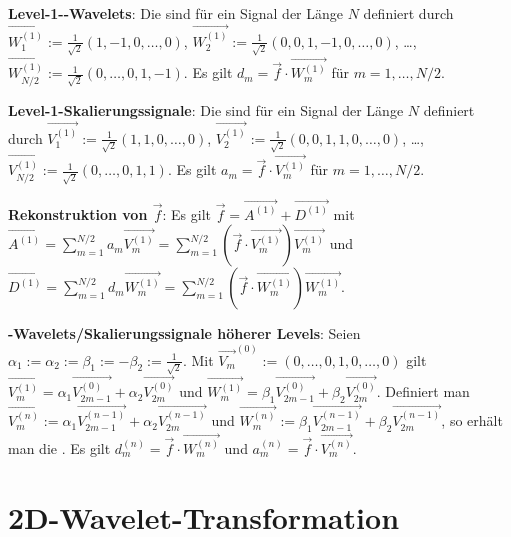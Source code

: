 \linie

\textbf{Level-1--Wavelets}:
Die  sind für ein Signal der Länge $N$ definiert durch
$\vec{W_1^{(1)}} := \frac{1}{\sqrt{2}} (1, -1, 0, \dotsc, 0)$,
$\vec{W_2^{(1)}} := \frac{1}{\sqrt{2}} (0, 0, 1, -1, 0, \dotsc, 0)$,
\dots,\\
$\vec{W_{N/2}^{(1)}} := \frac{1}{\sqrt{2}} (0, \dotsc, 0, 1, -1)$.
Es gilt $d_m = \vec{f} \cdot \vec{W_m^{(1)}}$ für $m = 1, \dotsc, N/2$.

\textbf{Level-1-Skalierungssignale}:
Die  sind für ein Signal der Länge $N$ definiert durch
$\vec{V_1^{(1)}} := \frac{1}{\sqrt{2}} (1, 1, 0, \dotsc, 0)$,
$\vec{V_2^{(1)}} := \frac{1}{\sqrt{2}} (0, 0, 1, 1, 0, \dotsc, 0)$,
\dots,\\
$\vec{V_{N/2}^{(1)}} := \frac{1}{\sqrt{2}} (0, \dotsc, 0, 1, 1)$.
Es gilt $a_m = \vec{f} \cdot \vec{V_m^{(1)}}$ für $m = 1, \dotsc, N/2$.

\textbf{Rekonstruktion von $\vec{f}$}:
Es gilt $\vec{f} = \vec{A^{(1)}} + \vec{D^{(1)}}$ mit\\
$\vec{A^{(1)}} = \sum_{m=1}^{N/2} a_m \vec{V_m^{(1)}}
= \sum_{m=1}^{N/2} (\vec{f} \cdot \vec{V_m^{(1)}}) \vec{V_m^{(1)}}$ und
$\vec{D^{(1)}} = \sum_{m=1}^{N/2} d_m \vec{W_m^{(1)}}
= \sum_{m=1}^{N/2} (\vec{f} \cdot \vec{W_m^{(1)}}) \vec{W_m^{(1)}}$.

\linie

\textbf{-Wavelets/Skalierungssignale höherer Levels}:
Seien $\alpha_1 := \alpha_2 := \beta_1 := -\beta_2 := \frac{1}{\sqrt{2}}$.
Mit $\vec{V_m}^{(0)} := (0, \dotsc, 0, 1, 0, \dotsc, 0)$ gilt
$\vec{V_m^{(1)}} = \alpha_1 \vec{V_{2m-1}^{(0)}} + \alpha_2 \vec{V_{2m}^{(0)}}$ und
$\vec{W_m^{(1)}} = \beta_1 \vec{V_{2m-1}^{(0)}} + \beta_2 \vec{V_{2m}^{(0)}}$.
Definiert man
$\vec{V_m^{(n)}} := \alpha_1 \vec{V_{2m-1}^{(n-1)}} + \alpha_2 \vec{V_{2m}^{(n-1)}}$ und
$\vec{W_m^{(n)}} := \beta_1 \vec{V_{2m-1}^{(n-1)}} + \beta_2 \vec{V_{2m}^{(n-1)}}$,
so erhält man die .
Es gilt $d_m^{(n)} = \vec{f} \cdot \vec{W_m^{(n)}}$ und
$a_m^{(n)} = \vec{f} \cdot \vec{V_m^{(n)}}$.

\pagebreak

\section{%
    2D-Wavelet-Transformation%
}

